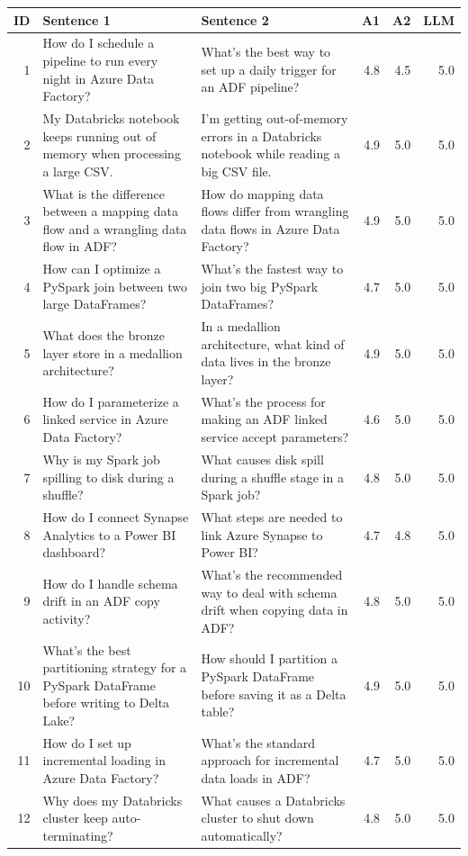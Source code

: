 \documentclass[11pt]{article}
\begin{document}
\begin{table}[t]
\centering\scriptsize\setlength{\tabcolsep}{3pt}
\begin{tabular}{rp{6.3cm}p{6.3cm}rrr}
\toprule
ID & Sentence 1 & Sentence 2 & A1 & A2 & LLM \\
\midrule
1 & How do I schedule a pipeline to run every night in Azure Data Factory? & What's the best way to set up a daily trigger for an ADF pipeline? & 4.8 & 4.5 & 5.0 \\
2 & My Databricks notebook keeps running out of memory when processing a large CSV. & I'm getting out-of-memory errors in a Databricks notebook while reading a big CSV file. & 4.9 & 5.0 & 5.0 \\
3 & What is the difference between a mapping data flow and a wrangling data flow in ADF? & How do mapping data flows differ from wrangling data flows in Azure Data Factory? & 4.9 & 5.0 & 5.0 \\
4 & How can I optimize a PySpark join between two large DataFrames? & What's the fastest way to join two big PySpark DataFrames? & 4.7 & 5.0 & 5.0 \\
5 & What does the bronze layer store in a medallion architecture? & In a medallion architecture, what kind of data lives in the bronze layer? & 4.9 & 5.0 & 5.0 \\
6 & How do I parameterize a linked service in Azure Data Factory? & What's the process for making an ADF linked service accept parameters? & 4.6 & 5.0 & 5.0 \\
7 & Why is my Spark job spilling to disk during a shuffle? & What causes disk spill during a shuffle stage in a Spark job? & 4.8 & 5.0 & 5.0 \\
8 & How do I connect Synapse Analytics to a Power BI dashboard? & What steps are needed to link Azure Synapse to Power BI? & 4.7 & 4.8 & 5.0 \\
9 & How do I handle schema drift in an ADF copy activity? & What's the recommended way to deal with schema drift when copying data in ADF? & 4.8 & 5.0 & 5.0 \\
10 & What's the best partitioning strategy for a PySpark DataFrame before writing to Delta Lake? & How should I partition a PySpark DataFrame before saving it as a Delta table? & 4.9 & 5.0 & 5.0 \\
11 & How do I set up incremental loading in Azure Data Factory? & What's the standard approach for incremental data loads in ADF? & 4.7 & 5.0 & 5.0 \\
12 & Why does my Databricks cluster keep auto-terminating? & What causes a Databricks cluster to shut down automatically? & 4.8 & 5.0 & 5.0 \\

\end{tabular}
\end{table}
\end{document}
